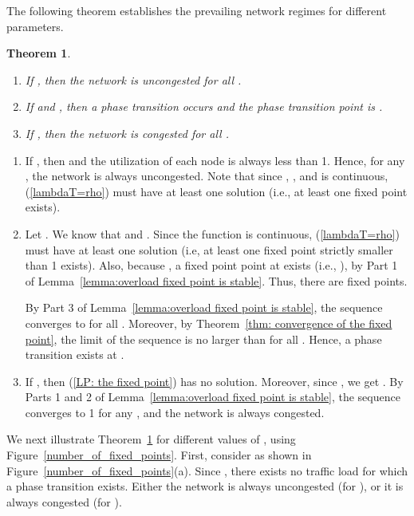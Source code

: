 \documentclass{IEEEtran}
\newtheorem{theorem}{Theorem}
\begin{document}
The following theorem establishes the prevailing network regimes for different parameters.
\begin{theorem} \label{Thm: three stages}
\leavevmode
\begin{enumerate}
\item If , then the network is uncongested for all .
\item If  and , then a phase transition occurs and the phase transition point is  .
\item If , then the network is congested for all .

\end{enumerate}
\end{theorem}
\begin{IEEEproof}
\leavevmode
\begin{enumerate}
\item If , then  and the utilization of each node is always less than 1. Hence, for any ,  the network is
    always uncongested. Note that since , , and  is continuous,  (\ref{lambdaT=rho}) must have at least one solution
    (i.e., at least one fixed point exists).

\item Let . We know that  and . Since the function  is continuous,  (\ref{lambdaT=rho})
    must have at least one solution (i.e, at least one fixed point strictly smaller than 1 exists). Also,  because , a fixed point
    point at  exists (i.e., ), by Part 1 of Lemma~\ref{lemma:overload fixed point is stable}.  Thus, there are 
    fixed points.

By Part 3 of Lemma~\ref{lemma:overload fixed point is stable}, the sequence  converges to  for all .  Moreover, by Theorem~\ref{thm: convergence of the fixed point}, the limit of the sequence  is no
larger than  for all . Hence, a phase transition exists at .



\item If , then (\ref{LP: the fixed point}) has no solution.  Moreover, since , we get . By Parts 1 and 2 of Lemma~\ref{lemma:overload fixed point is stable}, the sequence  converges to 1 for any , and the network is always congested.


\end{enumerate}
\end{IEEEproof}


We next illustrate Theorem~\ref{Thm: three stages} for different values of , using  Figure~\ref{number_of_fixed_points}.
First, consider  as shown in Figure~\ref{number_of_fixed_points}(a). Since , there exists no traffic load  for
which a phase transition exists. Either the network is always uncongested (for ), or it is always congested (for ).
\end{document}
